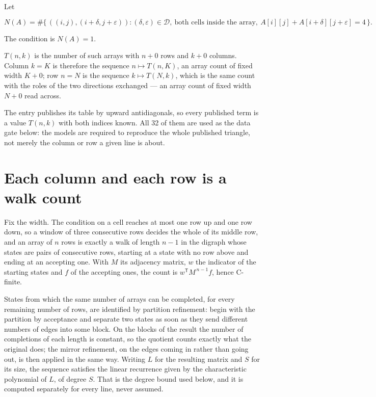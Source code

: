\documentclass[11pt]{article}
\theoremstyle{definition}
\begin{document}
Let

\[N(A) = \#\bigl\{\,((i,j),(i{+}\delta,j{+}\varepsilon)) : (\delta,\varepsilon) \in \mathcal{D},\ \text{both cells inside the array},\ A[i][j] + A[i{+}\delta][j{+}\varepsilon] = 4\,\bigr\}.\]

The condition is $N(A) = 1$.

$T(n,k)$ is the number of such arrays with $n + 0$ rows and $k + 0$ columns. Column $k = K$ is therefore the sequence $n \mapsto T(n,K)$, an array count of fixed width $K + 0$; row $n = N$ is the sequence $k \mapsto T(N,k)$, which is the same count with the roles of the two directions exchanged --- an array count of fixed width $N + 0$ read across.

The entry publishes its table by upward antidiagonals, so every published term is a value $T(n,k)$ with both indices known. All 32 of them are used as the data gate below: the models are required to reproduce the whole published triangle, not merely the column or row a given line is about.

\section{Each column and each row is a walk count}

Fix the width. The condition on a cell reaches at most one row up and one row down, so a window of three consecutive rows decides the whole of its middle row, and an array of $n$ rows is exactly a walk of length $n-1$ in the digraph whose states are pairs of consecutive rows, starting at a state with no row above and ending at an accepting one. With $M$ its adjacency matrix, $w$ the indicator of the starting states and $f$ of the accepting ones, the count is $w^{\mathsf T}M^{\,n-1}f$, hence C-finite.

States from which the same number of arrays can be completed, for every remaining number of rows, are identified by partition refinement: begin with the partition by acceptance and separate two states as soon as they send different numbers of edges into some block. On the blocks of the result the number of completions of each length is constant, so the quotient counts exactly what the original does; the mirror refinement, on the edges coming in rather than going out, is then applied in the same way. Writing $L$ for the resulting matrix and $S$ for its size, the sequence satisfies the linear recurrence given by the characteristic polynomial of $L$, of degree $S$. That is the degree bound used below, and it is computed separately for every line, never assumed.
\end{document}
